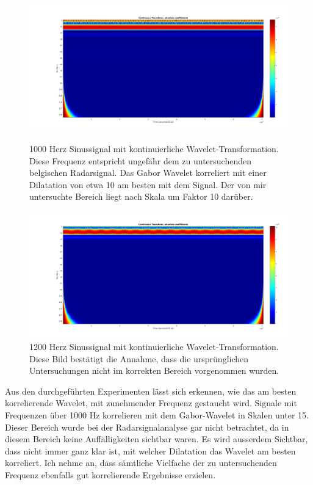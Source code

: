 \begin{refsection}
\begin{figure}[h]
	\centering
	\includegraphics[width=0.9\linewidth]{papers/meteor/images/anomalie/beam/cwt_1000hz.png}
	\caption{1000 Herz Sinussignal mit kontinuierliche Wavelet-Transformation.
	Diese Frequenz entspricht ungefähr dem zu untersuchenden belgischen Radarsignal.
	Das Gabor Wavelet korreliert mit einer Dilatation von etwa 10 am besten mit dem Signal.
	Der von mir untersuchte Bereich liegt nach Skala um Faktor 10 darüber.}
	\includegraphics[width=0.9\linewidth]{papers/meteor/images/anomalie/beam/cwt_1200hz.png}
	\caption{1200 Herz Sinussignal mit kontinuierliche Wavelet-Transformation.
	Diese Bild bestätigt die Annahme, dass die ursprünglichen Untersuchungen nicht im korrekten Bereich vorgenommen wurden.}
	\label{fig:cwt_anomalie_beam_2}
\end{figure}
Aus den durchgeführten Experimenten lässt sich erkennen, wie das am besten korrelierende Wavelet, mit zunehmender Frequenz gestaucht wird. 
Signale mit Frequenzen über 1000 Hz korrelieren mit dem Gabor-Wavelet in Skalen unter 15.
Dieser Bereich wurde bei der Radarsignalanalyse gar nicht betrachtet, da in diesem Bereich keine Auffälligkeiten sichtbar waren. 
Es wird ausserdem Sichtbar, dass nicht immer ganz klar ist, mit welcher Dilatation das Wavelet am besten korreliert.
Ich nehme an, dass sämtliche Vielfache der zu untersuchenden Frequenz ebenfalls gut korrelierende Ergebnisse erzielen. 


\end{refsection}
